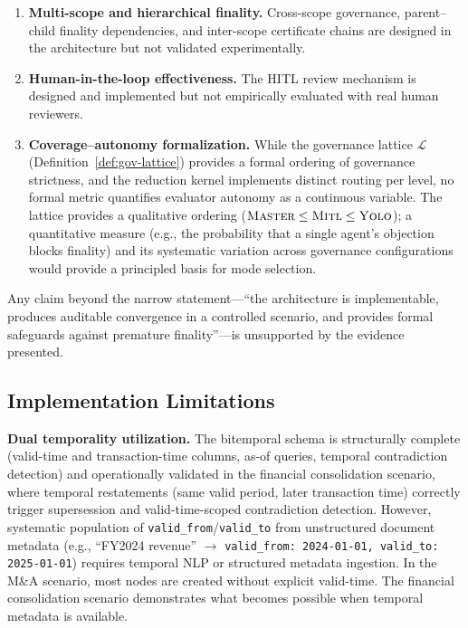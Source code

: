 \documentclass[11pt]{article}
\begin{document}
\begin{enumerate}
  \item \textbf{Multi-scope and hierarchical finality.} Cross-scope governance, parent--child finality dependencies, and inter-scope certificate chains are designed in the architecture but not validated experimentally.
  \item \textbf{Human-in-the-loop effectiveness.} The HITL review mechanism is designed and implemented but not empirically evaluated with real human reviewers.
  \item \textbf{Coverage--autonomy formalization.} While the governance lattice $\mathcal{L}$ (Definition~\ref{def:gov-lattice}) provides a formal ordering of governance strictness, and the reduction kernel implements distinct routing per level, no formal metric quantifies evaluator autonomy as a continuous variable. The lattice provides a qualitative ordering ($\textsc{Master} \leq \textsc{Mitl} \leq \textsc{Yolo}$); a quantitative measure (e.g., the probability that a single agent's objection blocks finality) and its systematic variation across governance configurations would provide a principled basis for mode selection.
\end{enumerate}

Any claim beyond the narrow statement---``the architecture is implementable, produces auditable convergence in a controlled scenario, and provides formal safeguards against premature finality''---is unsupported by the evidence presented.

\subsection{Implementation Limitations}

\textbf{Dual temporality utilization.} The bitemporal schema is structurally complete (valid-time and transaction-time columns, as-of queries, temporal contradiction detection) and operationally validated in the financial consolidation scenario, where temporal restatements (same valid period, later transaction time) correctly trigger supersession and valid-time-scoped contradiction detection. However, systematic population of \texttt{valid\_from}/\texttt{valid\_to} from unstructured document metadata (e.g., ``FY2024 revenue'' $\rightarrow$ \texttt{valid\_from: 2024-01-01, valid\_to: 2025-01-01}) requires temporal NLP or structured metadata ingestion. In the M\&A scenario, most nodes are created without explicit valid-time. The financial consolidation scenario demonstrates what becomes possible when temporal metadata is available.
\end{document}
